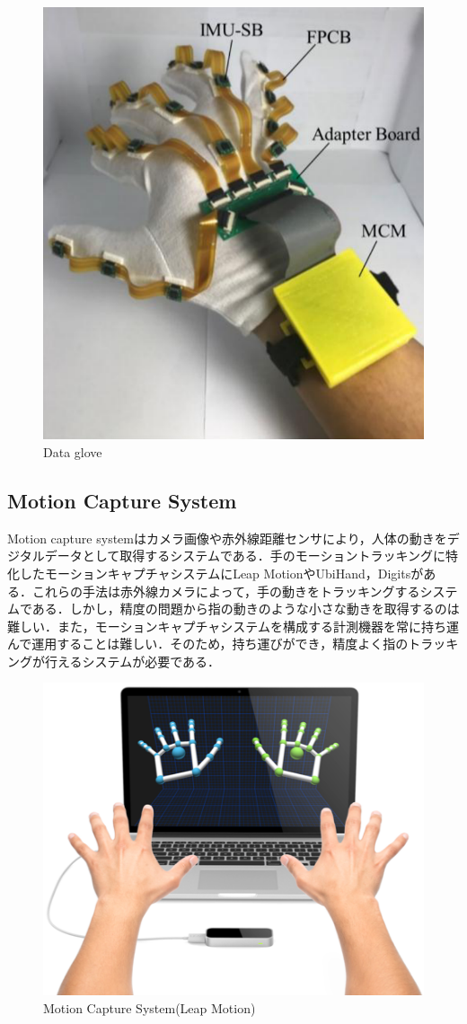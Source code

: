 \begin{figure}[H]
  \centering
  \includegraphics[width=0.6\linewidth]{fig/ch1/data_glove}
  \caption{Data glove\cite{Lin2018}}
  \label{fig:Data glove}
\end{figure}

\subsection*{Motion Capture System}
Motion capture systemはカメラ画像や赤外線距離センサにより，人体の動きをデジタルデータとして取得するシステムである．手のモーショントラッキングに特化したモーションキャプチャシステムにLeap MotionやUbiHand，Digits\cite{Ahmad2006,Kim2012}がある．これらの手法は赤外線カメラによって，手の動きをトラッキングするシステムである．しかし，精度の問題から指の動きのような小さな動きを取得するのは難しい．また，モーションキャプチャシステムを構成する計測機器を常に持ち運んで運用することは難しい．そのため，持ち運びができ，精度よく指のトラッキングが行えるシステムが必要である．

\begin{figure}[H]
  \centering
  \includegraphics[width=0.6\linewidth]{fig/ch1/mcs}
  \caption{Motion Capture System(Leap Motion)}
  \label{fig:Motion Capture System}
\end{figure}


